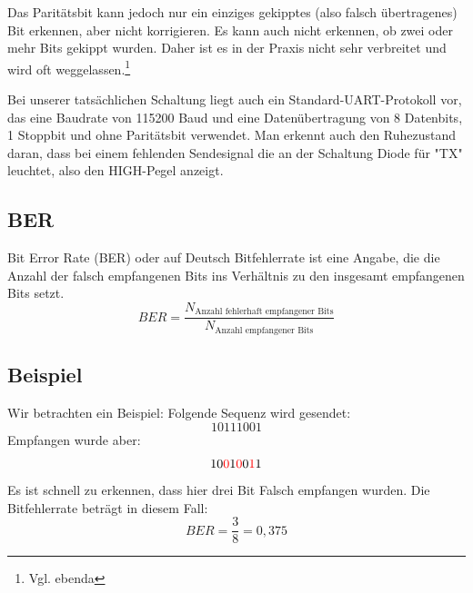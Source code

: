 Das Paritätsbit kann jedoch nur ein einziges gekipptes (also falsch übertragenes) Bit erkennen, aber nicht korrigieren. Es kann auch nicht erkennen, ob zwei oder mehr Bits gekippt wurden. Daher ist es in der Praxis nicht sehr verbreitet und wird oft weggelassen.\footnote{Vgl. ebenda}

Bei unserer tatsächlichen Schaltung liegt auch ein Standard-UART-Protokoll vor, das eine Baudrate von 115200 Baud und eine Datenübertragung von 8 Datenbits, 1 Stoppbit und ohne Paritätsbit verwendet. Man erkennt auch den Ruhezustand daran, dass bei einem fehlenden Sendesignal die an der Schaltung Diode für "TX" leuchtet, also den HIGH-Pegel anzeigt.
\subsection{BER}
Bit Error Rate (BER) oder auf Deutsch Bitfehlerrate ist eine Angabe, die die
Anzahl der falsch empfangenen Bits ins Verhältnis zu den insgesamt empfangenen Bits setzt.
\begin{equation}
    BER = \frac{N_{\text{Anzahl fehlerhaft empfangener Bits}}}{N_{\text{Anzahl empfangener Bits}}}
\end{equation}
\subsection{Beispiel}
Wir betrachten ein Beispiel: Folgende Sequenz wird gesendet:
\begin{equation}
    10111001
\end{equation}
Empfangen wurde aber:
\begin{equation}
      10\textcolor{red}{0}1\textcolor{red}{0}0\textcolor{red}{1}1
\end{equation}
Es ist schnell zu erkennen, dass hier drei Bit Falsch empfangen  wurden.
Die Bitfehlerrate beträgt in diesem Fall:
\begin{equation}
    BER = \frac{3}{8} = 0,375
\end{equation}

